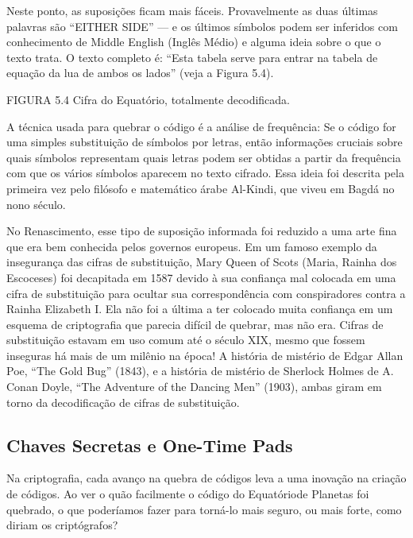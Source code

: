 \documentclass{book}
\begin{document}
Neste ponto, as suposições ficam mais fáceis. Provavelmente as duas últimas palavras são ``EITHER SIDE'' --- e os últimos símbolos podem ser inferidos com conhecimento de Middle English (Inglês Médio) e alguma ideia sobre o que o texto trata. O texto completo é: ``Esta tabela serve para entrar na tabela de equação da lua de ambos os lados'' (veja a Figura 5.4).

FIGURA 5.4 Cifra do Equatório, totalmente decodificada.

A técnica usada para quebrar o código é a análise de frequência: Se o código for uma simples substituição de símbolos por letras, então informações cruciais sobre quais símbolos representam quais letras podem ser obtidas a partir da frequência com que os vários símbolos aparecem no texto cifrado. Essa ideia foi descrita pela primeira vez pelo filósofo e matemático árabe Al-Kindi, que viveu em Bagdá no nono século.

No Renascimento, esse tipo de suposição informada foi reduzido a uma arte fina que era bem conhecida pelos governos europeus. Em um famoso exemplo da insegurança das cifras de substituição, Mary Queen of Scots (Maria, Rainha dos Escoceses) foi decapitada em 1587 devido à sua confiança mal colocada em uma cifra de substituição para ocultar sua correspondência com conspiradores contra a Rainha Elizabeth I. Ela não foi a última a ter colocado muita confiança em um esquema de criptografia que parecia difícil de quebrar, mas não era. Cifras de substituição estavam em uso comum até o século XIX, mesmo que fossem inseguras há mais de um milênio na época! A história de mistério de Edgar Allan Poe, ``The Gold Bug'' (1843), e a história de mistério de Sherlock Holmes de A. Conan Doyle, ``The Adventure of the Dancing Men'' (1903), ambas giram em torno da decodificação de cifras de substituição.


\subsection{Chaves Secretas e One-Time Pads}
\label{segredos:one-time-pads}

Na criptografia, cada avanço na quebra de códigos leva a uma inovação na criação de códigos. Ao ver o quão facilmente o código do Equatóriode Planetas foi quebrado, o que poderíamos fazer para torná-lo mais seguro, ou mais forte, como diriam os criptógrafos?
\end{document}
